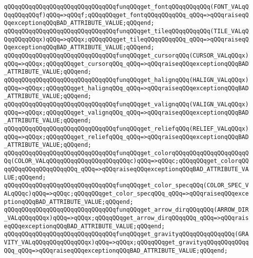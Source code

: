 \newline
\verb|qQQqqQQqqQQqqQQqqQQqqQQqqQQqqQQqfunqQQqget_fontqQQqqQQqqQQq(FONT_VALqQQqqQQqqQQqf)qQQq=>qQQqf;qQQqqQQqget_fontqQQqqQQqqQQq_qQQq=>qQQqraiseqQQqexceptionqQQqBAD_ATTRIBUTE_VALUE;qQQqend;|\newline
\verb|qQQqqQQqqQQqqQQqqQQqqQQqqQQqqQQqfunqQQqget_tileqQQqqQQqqQQq(TILE_VALqQQqqQQqqQQqx)qQQq=>qQQqx;qQQqqQQqget_tileqQQqqQQqqQQq_qQQq=>qQQqraiseqQQqexceptionqQQqBAD_ATTRIBUTE_VALUE;qQQqend;|\newline
\verb|qQQqqQQqqQQqqQQqqQQqqQQqqQQqqQQqfunqQQqget_cursorqQQq(CURSOR_VALqQQqx)qQQq=>qQQqx;qQQqqQQqget_cursorqQQq_qQQq=>qQQqraiseqQQqexceptionqQQqBAD_ATTRIBUTE_VALUE;qQQqend;|\newline
\newline
\verb|qQQqqQQqqQQqqQQqqQQqqQQqqQQqqQQqfunqQQqget_halignqQQq(HALIGN_VALqQQqx)qQQq=>qQQqx;qQQqqQQqget_halignqQQq_qQQq=>qQQqraiseqQQqexceptionqQQqBAD_ATTRIBUTE_VALUE;qQQqend;|\newline
\verb|qQQqqQQqqQQqqQQqqQQqqQQqqQQqqQQqfunqQQqget_valignqQQq(VALIGN_VALqQQqx)qQQq=>qQQqx;qQQqqQQqget_valignqQQq_qQQq=>qQQqraiseqQQqexceptionqQQqBAD_ATTRIBUTE_VALUE;qQQqend;|\newline
\newline
\verb|qQQqqQQqqQQqqQQqqQQqqQQqqQQqqQQqfunqQQqget_reliefqQQq(RELIEF_VALqQQqx)qQQq=>qQQqx;qQQqqQQqget_reliefqQQq_qQQq=>qQQqraiseqQQqexceptionqQQqBAD_ATTRIBUTE_VALUE;qQQqend;|\newline
\newline
\verb|qQQqqQQqqQQqqQQqqQQqqQQqqQQqqQQqfunqQQqget_colorqQQqqQQqqQQqqQQqqQQqqQQq(COLOR_VALqQQqqQQqqQQqqQQqqQQqqQQqc)qQQq=>qQQqc;qQQqqQQqget_colorqQQqqQQqqQQqqQQqqQQqqQQq_qQQq=>qQQqraiseqQQqexceptionqQQqBAD_ATTRIBUTE_VALUE;qQQqend;|\newline
\verb|qQQqqQQqqQQqqQQqqQQqqQQqqQQqqQQqfunqQQqget_color_specqQQq(COLOR_SPEC_VALqQQqc)qQQq=>qQQqc;qQQqqQQqget_color_specqQQq_qQQq=>qQQqraiseqQQqexceptionqQQqBAD_ATTRIBUTE_VALUE;qQQqend;|\newline
\newline
\verb|qQQqqQQqqQQqqQQqqQQqqQQqqQQqqQQqfunqQQqget_arrow_dirqQQqqQQq(ARROW_DIR_VALqQQqqQQqx)qQQq=>qQQqx;qQQqqQQqget_arrow_dirqQQqqQQq_qQQq=>qQQqraiseqQQqexceptionqQQqBAD_ATTRIBUTE_VALUE;qQQqend;|\newline
\verb|qQQqqQQqqQQqqQQqqQQqqQQqqQQqqQQqfunqQQqget_gravityqQQqqQQqqQQqqQQq(GRAVITY_VALqQQqqQQqqQQqqQQqx)qQQq=>qQQqx;qQQqqQQqget_gravityqQQqqQQqqQQqqQQq_qQQq=>qQQqraiseqQQqexceptionqQQqBAD_ATTRIBUTE_VALUE;qQQqend;|\newline
